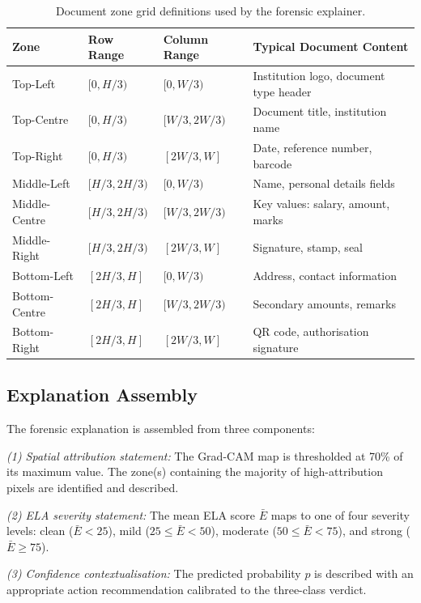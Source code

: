 \documentclass[12pt,a4paper,oneside]{report}
\begin{document}
\begin{table}[H]
\centering
\caption{Document zone grid definitions used by the forensic explainer.}
\label{tab:zones_full}
\begin{tabular}{lllp{5cm}}
\toprule
\textbf{Zone} & \textbf{Row Range} & \textbf{Column Range} & \textbf{Typical Document Content} \\
\midrule
Top-Left     & $[0, H/3)$     & $[0, W/3)$     & Institution logo, document type header \\
Top-Centre   & $[0, H/3)$     & $[W/3, 2W/3)$  & Document title, institution name \\
Top-Right    & $[0, H/3)$     & $[2W/3, W]$    & Date, reference number, barcode \\
Middle-Left  & $[H/3, 2H/3)$  & $[0, W/3)$     & Name, personal details fields \\
Middle-Centre & $[H/3, 2H/3)$ & $[W/3, 2W/3)$  & Key values: salary, amount, marks \\
Middle-Right & $[H/3, 2H/3)$  & $[2W/3, W]$    & Signature, stamp, seal \\
Bottom-Left  & $[2H/3, H]$    & $[0, W/3)$     & Address, contact information \\
Bottom-Centre & $[2H/3, H]$   & $[W/3, 2W/3)$  & Secondary amounts, remarks \\
Bottom-Right  & $[2H/3, H]$   & $[2W/3, W]$    & QR code, authorisation signature \\
\bottomrule
\end{tabular}
\end{table}

\subsection{Explanation Assembly}

The forensic explanation is assembled from three components:

\textit{(1) Spatial attribution statement:} The Grad-CAM map is thresholded at
70\% of its maximum value. The zone(s) containing the majority of high-attribution
pixels are identified and described.

\textit{(2) ELA severity statement:} The mean ELA score $\bar{E}$ maps to one
of four severity levels: clean ($\bar{E}<25$), mild ($25\leq\bar{E}<50$),
moderate ($50\leq\bar{E}<75$), and strong ($\bar{E}\geq75$).

\textit{(3) Confidence contextualisation:} The predicted probability $p$ is
described with an appropriate action recommendation calibrated to the three-class
verdict.
\end{document}
